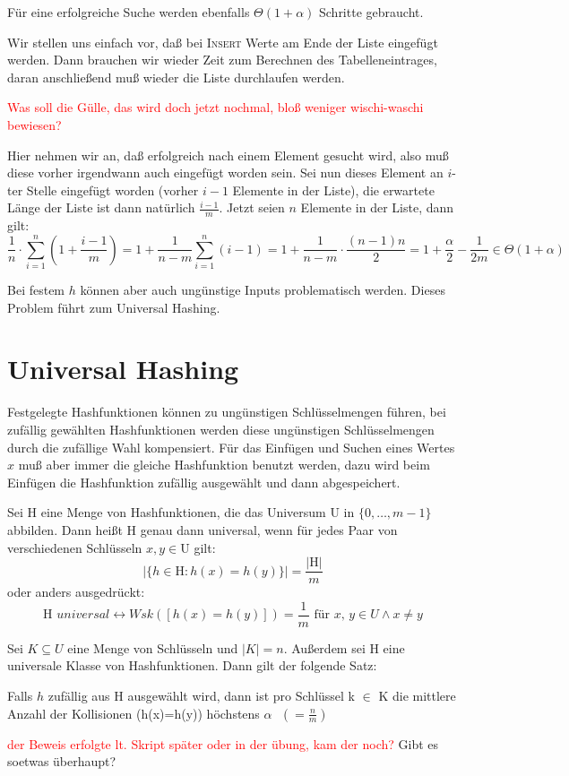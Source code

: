 \begin{satz}[Theorem 2]
Für eine erfolgreiche Suche werden ebenfalls $\Theta(1+\alpha)$ Schritte gebraucht.
\end{satz}
\begin{beweis}
Wir stellen uns einfach vor, daß bei \textsc{Insert} Werte am Ende der Liste eingefügt werden. Dann brauchen wir
wieder Zeit zum Berechnen des Tabelleneintrages, daran anschließend muß wieder die Liste durchlaufen werden.
\end{beweis} \textcolor{red}{Was soll die Gülle, das wird doch jetzt nochmal, bloß weniger wischi-waschi bewiesen?}
\begin{beweis}
Hier nehmen wir an, daß erfolgreich nach einem Element gesucht wird, also muß diese vorher irgendwann auch eingefügt
worden sein. Sei nun dieses Element an $i$-ter Stelle eingefügt worden (vorher $i-1$ Elemente in der Liste), die
erwartete Länge der Liste ist dann natürlich $\frac{i-1}{m}$. Jetzt seien $n$ Elemente in der Liste, dann gilt:
\[\frac{1}{n} \cdot \sum_{i=1}^n \left(1+\frac{i-1}{m}\right)=1+\frac{1}{n-m} \sum_{i=1}^n (i-1)=1+\frac{1}{n-m} \cdot
\frac{(n-1)n}{2}=1+\frac{\alpha}{2}-\frac{1}{2m} \in \Theta(1+\alpha)\]
\end{beweis}
Bei festem $h$ können aber auch ungünstige Inputs problematisch werden. Dieses Problem führt zum Universal Hashing.

\section{Universal Hashing}
Festgelegte Hashfunktionen können zu ungünstigen Schlüsselmengen führen, bei zufällig gewählten Hashfunktionen
werden diese ungünstigen Schlüsselmengen durch die zufällige Wahl kompensiert. Für das Einfügen und Suchen eines Wertes
$x$ muß aber immer die gleiche Hashfunktion benutzt werden, dazu wird beim Einfügen die Hashfunktion zufällig
ausgewählt und dann abgespeichert.

\begin{definition}
Sei H eine Menge von Hashfunktionen, die das Universum U in $\{0, \ldots, m-1\}$ abbilden. Dann heißt H genau dann
universal, wenn für jedes Paar von verschiedenen Schlüsseln $x, y \in $U gilt:
\[\vert\{h \in \mbox{H} : h(x)=h(y)\}\vert=\frac{\vert \mbox{H}\vert}{m}\]
oder anders ausgedrückt:
\[\mbox{H }universal \leftrightarrow Wsk([h(x)=h(y)])=\frac{1}{m}
\mbox{ für }x,\, y \in U \wedge x\neq y\]
\end{definition}

Sei $K \subseteq U$ eine Menge von Schlüsseln und $\vert K\vert =n$. Außerdem sei H eine universale Klasse von
Hashfunktionen. Dann gilt der folgende Satz:
\begin{satz}
Falls $h$ zufällig aus H ausgewählt wird, dann ist pro Schlüssel k $\in$ K die mittlere Anzahl der Kollisionen
(h(x)=h(y)) höchstens $\alpha \mbox{ } (=\frac{n}{m})$
\end{satz}
\textcolor{red}{der Beweis erfolgte lt. Skript später oder in der übung, kam der noch?}
Gibt es soetwas überhaupt?

